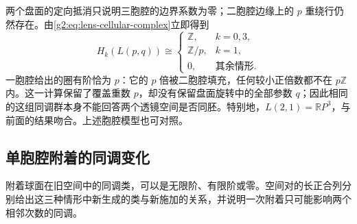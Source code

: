 两个盘面的定向抵消只说明三胞腔的边界系数为零；二胞腔边缘上的 \(p\) 重绕行仍然存在。由\eqref{g2:eq:lens-cellular-complex}立即得到
\begin{equation}\label{g2:eq:lens-integer-homology}
	H_k(L(p,q))\cong
	\begin{cases}
		\mathbb Z,&k=0,3,\\
		\mathbb Z/p,&k=1,\\
		0,&\text{其余情形}.
	\end{cases}
\end{equation}
一胞腔给出的圈有阶恰为 \(p\)：它的 \(p\) 倍被二胞腔填充，任何较小正倍数都不在 \(p\mathbb Z\) 内。这一计算保留了覆盖重数 \(p\)，却没有保留盘面旋转中的全部参数 \(q\)；因此相同的这组同调群本身不能回答两个透镜空间是否同胚。特别地，\(L(2,1)=\mathbb RP^3\)，与前面的结果吻合。上述胞腔模型也可对照\cite[第2.2节，Cellular Homology]{Hatcher2002}。

\subsection{单胞腔附着的同调变化}
\label{g2:subsec:0303:04}

附着球面在旧空间中的同调类，可以是无限阶、有限阶或零。空间对的长正合列分别给出这三种情形中新生成的类与新施加的关系，并说明一次附着只可能影响两个相邻次数的同调。

